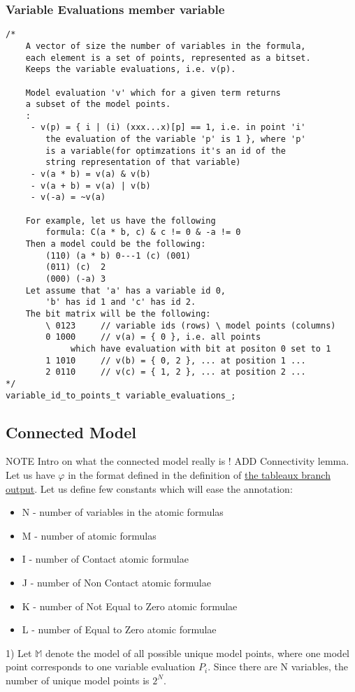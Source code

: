 \documentclass{article}
\begin{document}
		\subsubsection*{Variable Evaluations member variable}
			\begin{lstlisting}
/*
    A vector of size the number of variables in the formula, 
    each element is a set of points, represented as a bitset.
    Keeps the variable evaluations, i.e. v(p).

    Model evaluation 'v' which for a given term returns 
    a subset of the model points.
    :
     - v(p) = { i | (i) (xxx...x)[p] == 1, i.e. in point 'i' 
        the evaluation of the variable 'p' is 1 }, where 'p'
        is a variable(for optimzations it's an id of the 
        string representation of that variable)
     - v(a * b) = v(a) & v(b)
     - v(a + b) = v(a) | v(b)
     - v(-a) = ~v(a)

    For example, let us have the following 
        formula: C(a * b, c) & c != 0 & -a != 0
    Then a model could be the following:
        (110) (a * b) 0---1 (c) (001)
        (011) (c)  2
        (000) (-a) 3
    Let assume that 'a' has a variable id 0, 
        'b' has id 1 and 'c' has id 2.
    The bit matrix will be the following:
        \ 0123     // variable ids (rows) \ model points (columns)
        0 1000     // v(a) = { 0 }, i.e. all points 
             which have evaluation with bit at positon 0 set to 1
        1 1010     // v(b) = { 0, 2 }, ... at position 1 ...
        2 0110     // v(c) = { 1, 2 }, ... at position 2 ...
*/
variable_id_to_points_t variable_evaluations_;
			\end{lstlisting}

	\subsection{Connected Model}
		NOTE Intro on what the connected model really is !
		ADD Connectivity lemma.
		Let us have $\varphi$ in the format defined in the definition of \hyperref[tableaux:branch:output]{the tableaux branch output}. %
		Let us define few constants which will ease the annotation:
		\begin{itemize}
			\item N - number of variables in the atomic formulas
			\item M - number of atomic formulas
			\item I - number of Contact atomic formulae
			\item J - number of Non Contact atomic formulae
			\item K - number of Not Equal to Zero atomic formulae
			\item L - number of Equal to Zero atomic formulae
		\end{itemize}
		1) Let $\mathbb{M}$ denote the model of all possible unique model points, where one model point corresponds to 
			one variable evaluation $P_i$. 
			\newline
			Since there are N variables, the number of unique model points is $2^N$.
			\newline
\end{document}
